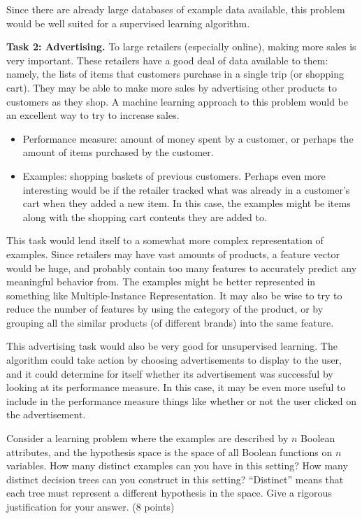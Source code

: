 \documentclass[fleqn]{homework}
\begin{document}
\begin{problem}{3}
    Since there are already large databases of example data available, this
    problem would be well suited for a supervised learning algorithm.

    \textbf{Task 2: Advertising.}  To large retailers (especially online),
    making more sales is very important.  These retailers have a good deal of
    data available to them: namely, the lists of items that customers purchase
    in a single trip (or shopping cart).  They may be able to make more sales by
    advertising other products to customers as they shop.  A machine learning
    approach to this problem would be an excellent way to try to increase sales.

    \begin{itemize}
    \item Performance measure: amount of money spent by a customer, or perhaps
      the amount of items purchased by the customer.
    \item Examples: shopping baskets of previous customers.  Perhaps even more
      interesting would be if the retailer tracked what was already in a
      customer's cart when they added a new item.  In this case, the examples
      might be items along with the shopping cart contents they are added to.
    \end{itemize}

    This task would lend itself to a somewhat more complex representation of
    examples.  Since retailers may have vast amounts of products, a feature
    vector would be huge, and probably contain too many features to accurately
    predict any meaningful behavior from.  The examples might be better
    represented in something like Multiple-Instance Representation.  It may also
    be wise to try to reduce the number of features by using the category of the
    product, or by grouping all the similar products (of different brands) into
    the same feature.

    This advertising task would also be very good for unsupervised learning.
    The algorithm could take action by choosing advertisements to display to the
    user, and it could determine for itself whether its advertisement was
    successful by looking at its performance measure.  In this case, it may be
    even more useful to include in the performance measure things like whether
    or not the user clicked on the advertisement.
  \end{problem}

  \begin{problem}{4}
    \begin{question}
      Consider a learning problem where the examples are described by $n$
      Boolean attributes, and the hypothesis space is the space of all Boolean
      functions on $n$ variables.  How many distinct examples can you have in
      this setting?  How many distinct decision trees can you construct in this
      setting?  ``Distinct'' means that each tree must represent a different
      hypothesis in the space.  Give a rigorous justification for your
      answer. (8 points)
    \end{question}
  \end{problem}
\end{document}
